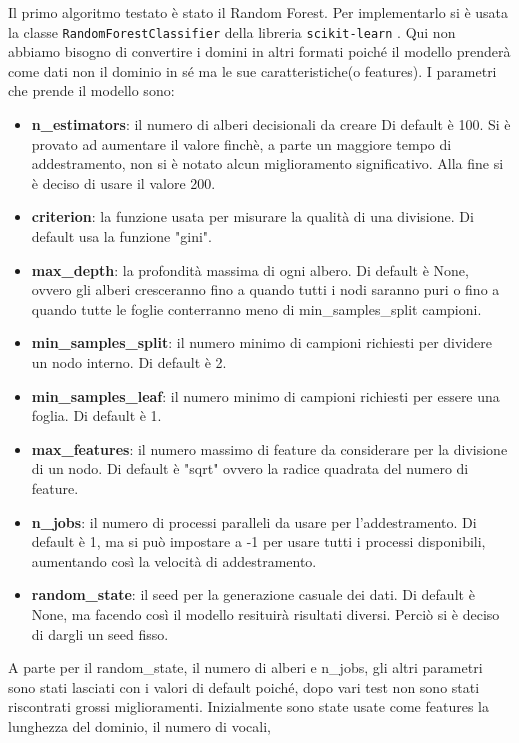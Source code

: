 \documentclass[12pt,a4paper,openright,twoside]{book}
\begin{document}
Il primo algoritmo testato è stato il Random Forest.
Per implementarlo si è usata la classe \texttt{RandomForestClassifier} della libreria
\texttt{scikit-learn} \cite{scikit_learn_rf}.
Qui non abbiamo bisogno di convertire i domini in
altri formati poiché il modello prenderà
come dati non il dominio in sé ma le sue caratteristiche(o features).
I parametri che prende il modello sono:
\begin{itemize}
    \item \textbf{n\_estimators}: il numero di alberi decisionali da creare
    Di default è 100. Si è provato ad aumentare il valore finchè, a parte un maggiore
    tempo di addestramento, non si è notato alcun miglioramento significativo.
    Alla fine si è deciso di usare il valore 200.
    \item \textbf{criterion}: la funzione usata per misurare la qualità di una divisione.
    Di default usa la funzione "gini".
    \item \textbf{max\_depth}: la profondità massima di ogni albero.
    Di default è None, ovvero gli alberi cresceranno fino a quando
    tutti i nodi saranno puri o fino a quando tutte le foglie
    conterranno meno di min\_samples\_split campioni.
    \item \textbf{min\_samples\_split}: il numero minimo di campioni richiesti
    per dividere un nodo interno. Di default è 2.
    \item \textbf{min\_samples\_leaf}: il numero minimo di campioni richiesti
    per essere una foglia. Di default è 1.
    \item \textbf{max\_features}: il numero massimo di feature da considerare
    per la divisione di un nodo. Di default è "sqrt" ovvero la radice quadrata
    del numero di feature.
    \item \textbf{n\_jobs}: il numero di processi paralleli da usare per l'addestramento.
    Di default è 1, ma si può impostare a -1 per usare tutti i processi disponibili, 
    aumentando così la velocità di addestramento.
    \item \textbf{random\_state}: il seed per la generazione casuale dei dati.
    Di default è None, ma facendo così il modello resituirà risultati diversi.
    Perciò si è deciso di dargli un seed fisso.
\end{itemize}
A parte per il random\_state, il numero di alberi e n\_jobs, gli altri parametri sono stati lasciati
con i valori di default poiché, dopo vari test non sono stati riscontrati grossi miglioramenti.
Inizialmente sono state usate come features la lunghezza del dominio, il numero di vocali,
\end{document}
